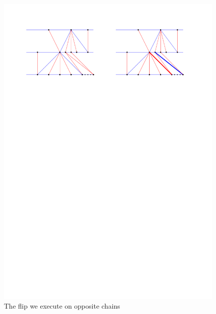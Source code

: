   \begin{figure}[h]
    \centering
    \includegraphics[width = \textwidth]{unifiedAlgo/img/post/oppFlip}
    \caption{The flip we execute on opposite chains}
    \label{fig:uni:oppFlip}
  \end{figure}

